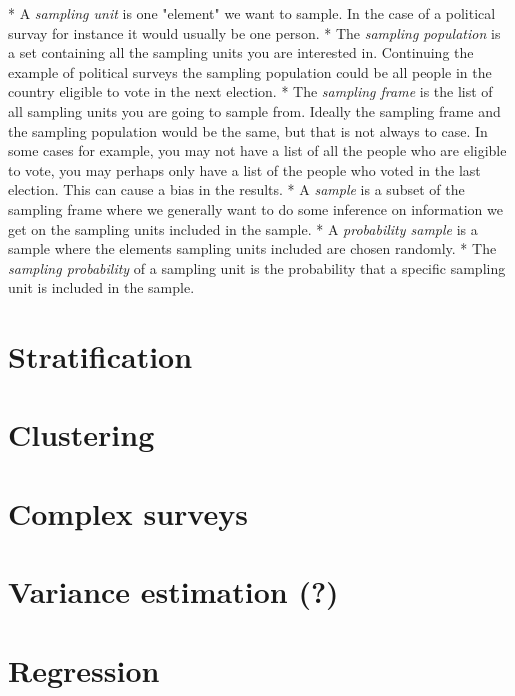 \documentclass{article}
\begin{document}
* A \emph{sampling unit} is one "element" we want to sample. In the case of a political survay for instance it would usually be one person.
* The \emph{sampling population} is a set containing all the sampling units you are interested in. Continuing the example of political surveys the sampling population could be all people in the country eligible to vote in the next election.
* The \emph{sampling frame} is the list of all sampling units you are going to sample from. Ideally the sampling frame and the sampling population would be the same, but that is not always to case. In some cases for example, you may not have a list of all the people who are eligible to vote, you may perhaps only have a list of the people who voted in the last election. This can cause a bias in the results.
* A \emph{sample} is a subset of the sampling frame where we generally want to do some inference on information we get on the sampling units included in the sample.
* A \emph{probability sample} is a sample where the elements sampling units included are chosen randomly.
* The \emph{sampling probability} of a sampling unit is the probability that a specific sampling unit is included in the sample.

\section{Stratification}

\section{Clustering}

\section{Complex surveys}

\section{Variance estimation (?)}

\section{Regression}
\end{document}
